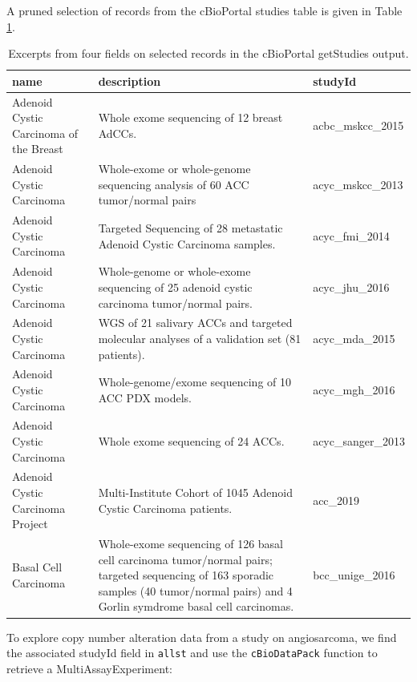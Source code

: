 A pruned selection of records from the cBioPortal
studies table is given in Table \ref{tab:tab-cball}.

\begin{longtable}[t]{>{\raggedright\arraybackslash}p{12em}>{\raggedright\arraybackslash}p{15em}l}
\caption{\label{tab:tab-cball}Excerpts from four fields on selected records in the cBioPortal getStudies output.}\\
\toprule
name & description & studyId\\
\midrule
Adenoid Cystic Carcinoma of the Breast & Whole exome sequencing of 12 breast AdCCs. & acbc\_mskcc\_2015\\
Adenoid Cystic Carcinoma & Whole-exome or whole-genome sequencing analysis of 60 ACC tumor/normal pairs & acyc\_mskcc\_2013\\
Adenoid Cystic Carcinoma & Targeted Sequencing of 28 metastatic Adenoid Cystic Carcinoma samples. & acyc\_fmi\_2014\\
Adenoid Cystic Carcinoma & Whole-genome or whole-exome sequencing of 25 adenoid cystic carcinoma tumor/normal pairs. & acyc\_jhu\_2016\\
Adenoid Cystic Carcinoma & WGS of 21 salivary ACCs and targeted molecular analyses of a validation set (81 patients). & acyc\_mda\_2015\\
\addlinespace
Adenoid Cystic Carcinoma & Whole-genome/exome sequencing of 10 ACC PDX models. & acyc\_mgh\_2016\\
Adenoid Cystic Carcinoma & Whole exome sequencing of 24 ACCs. & acyc\_sanger\_2013\\
Adenoid Cystic Carcinoma Project & Multi-Institute Cohort of 1045 Adenoid Cystic Carcinoma patients. & acc\_2019\\
Basal Cell Carcinoma & Whole-exome sequencing of 126 basal cell carcinoma tumor/normal pairs; targeted sequencing of 163 sporadic samples (40 tumor/normal pairs) and 4 Gorlin symdrome basal cell carcinomas. & bcc\_unige\_2016\\
\bottomrule
\end{longtable}

To explore copy number alteration data from a study on angiosarcoma,
we find the associated studyId field in \texttt{allst} and use the \texttt{cBioDataPack} function
to retrieve a MultiAssayExperiment:

